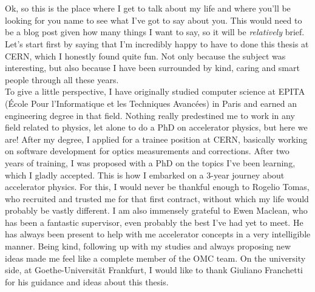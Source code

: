 \chapter{}


{
\fontsize{\fontsizeabstract}{\fontskipabstract}\selectfont

Ok, so this is the place where I get to talk about my life and where you'll be looking for you name
to see what I've got to say about you. This would need to be a blog post given how many things I
want to say, so it will be \textit{relatively} brief.
Let's start first by saying that I'm incredibly happy to have to done this thesis at CERN, which I
honestly found quite fun. Not only because the subject was interesting, but also because I have been
surrounded by kind, caring and smart people through all these years.\\
\indent
To give a little perspective, I have originally studied computer science at EPITA (École Pour
l'Informatique et les Techniques Avancées) in Paris and earned an engineering degree in that field.
Nothing really predestined me to work in any field related to physics, let alone to do a PhD on 
accelerator physics, but here we are! After my degree, I applied for a trainee position at CERN, 
basically working on software development for optics measurements and corrections. After two years
of training, I was proposed with a PhD on the topics I've been learning, which I gladly accepted.
This is how I embarked on a 3-year journey about accelerator physics. For this, I would never be 
thankful enough to Rogelio Tomas, who recruited and trusted me for that first contract, without
which my life would probably be vastly different.
I am also immensely grateful to Ewen Maclean, who has been a fantastic supervisor, even probably the
best I've had yet to meet. He has always been present to help with me accelerator concepts in a very
intelligible manner. Being kind, following up with my studies and always proposing new ideas made me
feel like a complete member of the OMC team. On the university side, at Goethe-Universität
Frankfurt, I would like to thank Giuliano Franchetti for his guidance and ideas about this thesis.

}
